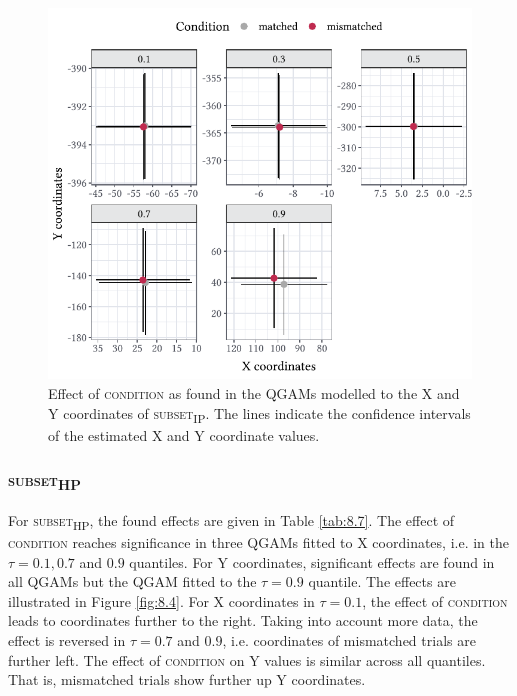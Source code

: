 \begin{figure}
    \centering
    \includegraphics[]{figures/fig8.3.pdf}
    \caption{Effect of \textsc{condition} as found in the QGAMs modelled to the X and Y coordinates of \textsc{subset\textsubscript{IP}}. The lines indicate the confidence intervals of the estimated X and Y coordinate values.}
    \label{fig:8_3}
\end{figure}

\subsubsection{\textsc{subset\textsubscript{HP}}}\label{section08_2_2_2}

For \textsc{subset\textsubscript{HP}}, the found effects are given in Table \ref{tab:8.7}. The effect of \textsc{condition} reaches significance in three QGAMs fitted to X coordinates, i.e. in the $\tau=0.1,0.7$ and $0.9$ quantiles. For Y coordinates, significant effects are found in all QGAMs but the QGAM fitted to the $\tau=0.9$ quantile. The effects are illustrated in Figure \ref{fig:8.4}. For X coordinates in $\tau=0.1$, the effect of \textsc{condition} leads to coordinates further to the right. Taking into account more data, the effect is reversed in $\tau=0.7$ and $0.9$, i.e. coordinates of mismatched trials are further left. The effect of \textsc{condition} on Y values is similar across all quantiles. That is, mismatched trials show further up Y coordinates.


